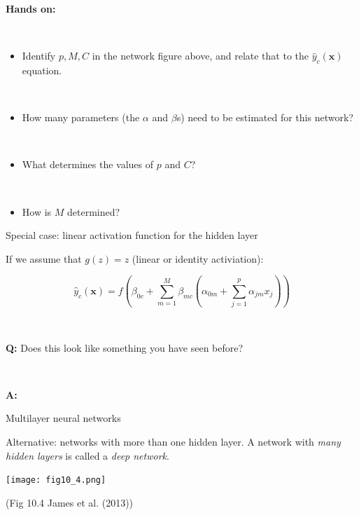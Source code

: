 \documentclass[
  10pt,
  ignorenonframetext,
  twocolumn]{beamer}
\providecommand{\tightlist}{%
  \setlength{\itemsep}{0pt}\setlength{\parskip}{0pt}}
\begin{document}
\begin{frame}
\textbf{Hands on:}

\(~\)

\begin{itemize}
\tightlist
\item
  Identify \(p, M, C\) in the network figure above, and relate that to
  the \(\hat{y}_{c}({\boldsymbol x})\) equation.
\end{itemize}

\(~\)

\begin{itemize}
\tightlist
\item
  How many parameters (the \(\alpha\) and \(\beta\)s) need to be
  estimated for this network?
\end{itemize}

\(~\)

\begin{itemize}
\tightlist
\item
  What determines the values of \(p\) and \(C\)?
\end{itemize}

\(~\)

\begin{itemize}
\tightlist
\item
  How is \(M\) determined?
\end{itemize}
\end{frame}

\begin{frame}
\begin{block}{Special case: linear activation function for the hidden
layer}
\label{special-case-linear-activation-function-for-the-hidden-layer}
\(~\)

If we assume that \(g(z)=z\) (linear or identity activiation):

\[
\hat{y}_c({\boldsymbol x})= f(\beta_{0c}+\sum_{m=1}^M \beta_{mc}(\alpha_{0m}+\sum_{j=1}^p \alpha_{jm}x_{j}))
\]

\(~\) \(~\)

\textbf{Q:} Does this look like something you have seen before?

\(~\)

\textbf{A:}
\end{block}
\end{frame}

\begin{frame}
\begin{block}{Multilayer neural networks}
\label{multilayer-neural-networks}
\(~\)

Alternative: networks with more than one hidden layer. A network with
\emph{many hidden layers} is called a \emph{deep network}.

\centering

\texttt{[image: fig10\_4.png]}

\scriptsize

(Fig 10.4 James et al. (2013))
\end{block}
\end{frame}
\end{document}
